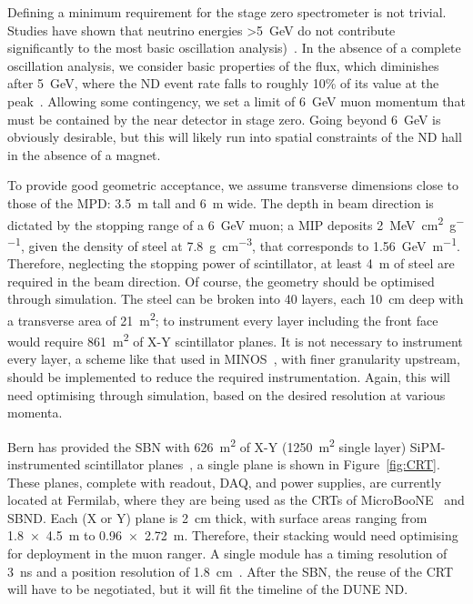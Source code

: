 \documentclass[a4paper]{article}
\begin{document}
Defining a minimum requirement for the stage zero spectrometer is not trivial. 
Studies have shown that neutrino energies \textgreater\SI{5}{\giga\electronvolt} do not contribute significantly to the most basic oscillation analysis)~\cite{elizabeth2}.%
In the absence of a complete oscillation analysis, we consider basic properties of the flux, which diminishes after \SI{5}{\giga\electronvolt}, where the ND event rate falls to roughly 10\% of its value at the peak~\cite{LBL}.
Allowing some contingency, we set a limit of \SI{6}{\giga\electronvolt} muon momentum that must be contained by the near detector in stage zero.
Going beyond \SI{6}{\giga\electronvolt} is obviously desirable, but this will likely run into spatial constraints of the ND hall in the absence of a magnet.  

                
To provide good geometric acceptance, we assume transverse dimensions close to those of the MPD: \SI{3.5}{\metre} tall and \SI{6}{\metre} wide.
The depth in beam direction is dictated by the stopping range of a \SI{6}{\giga\electronvolt} muon; a MIP deposits \SI{2}{\mega\electronvolt\per\centi\metre\squared\per\gram}, given the density of steel at \SI{7.8}{\gram\per\centi\metre\cubed}, that corresponds to \SI{1.56}{\giga\electronvolt\per\metre}.
Therefore, neglecting the stopping power of scintillator, at least \SI{4}{\metre} of steel are required in the beam direction.  
Of course, the geometry should be optimised through simulation.   
The steel can be broken into 40 layers, each \SI{10}{\centi\metre} deep with a transverse area of \SI{21}{\metre\squared}; to instrument every layer including the front face would require \SI{861}{\metre\squared} of X-Y scintillator planes.
It is not necessary to instrument every layer, a scheme like that used in MINOS~\cite{MINOSDetectors}, with finer granularity upstream, should be implemented to reduce the required instrumentation.
Again, this will need optimising through simulation, based on the desired resolution at various momenta.    


Bern has provided the SBN with \SI{626}{\metre\squared} of X-Y (\SI{1250}{\metre\squared} single layer) SiPM-instrumented scintillator planes~\cite{CRT}, a single plane is shown in Figure~\ref{fig:CRT}.
These planes, complete with readout, DAQ, and power supplies, are currently located at Fermilab, where they are being used as the CRTs of MicroBooNE~\cite{uBCRT} and SBND. 
Each (X or Y) plane is \SI{2}{\centi\metre} thick, with surface areas ranging from \SI[product-units=repeat]{1.8x4.5}{\metre} to \SI[product-units=repeat]{0.96x2.72}{\metre}.
Therefore, their stacking would need optimising for deployment in the muon ranger.
A single module has a timing resolution of \SI{3}{\nano\second} and a position resolution of \SI{1.8}{\centi\metre}~\cite{CRT,uBCRT}. 
After the SBN, the reuse of the CRT will have to be negotiated, but it will fit the timeline of the DUNE ND.  
\end{document}
